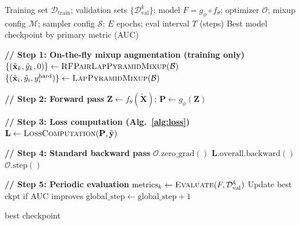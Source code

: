 \documentclass[12pt]{article}
\begin{document}
\clearpage
\begin{algorithm}[p]
\caption{Training Loop (per epoch)}
\label{alg:train}
\begin{algorithmic}[1]
\Require
  Training set $\mathcal{D}_{\text{train}}$; validation sets $\{\mathcal{D}_{\text{val}}^k\}$;
  model $F = g_\phi \circ f_\theta$; optimizer $\mathcal{O}$;
  mixup config $\mathcal{M}$; sampler config $\mathcal{S}$; $E$ epochs; eval interval $T$ (steps)
\Ensure
  Best model checkpoint by primary metric (AUC)


    \State \textbf{// Step 1: On-the-fly mixup augmentation (training only)}
        \State $\{(\tilde{\mathbf{x}}_k, \tilde{y}_k, 0)\} \gets \textsc{RFPairLapPyramidMixup}(\mathcal{B})$ 
      \Else
        \State $\{(\tilde{\mathbf{x}}_i, \tilde{y}_i, y^{\text{hard}}_i)\} \gets \textsc{LapPyramidMixup}(\mathcal{B})$ 
      \EndIf
    \EndIf

    \State \textbf{// Step 2: Forward pass}
    \State $\mathbf{Z} \gets f_\theta(\tilde{\mathbf{X}})$; \quad $\mathbf{P} \gets g_\phi(\mathbf{Z})$

    \State \textbf{// Step 3: Loss computation (Alg.~\ref{alg:loss})}
    \State $\mathbf{L} \gets \textsc{LossComputation}(\mathbf{P}, \tilde{\mathbf{y}})$

    \State \textbf{// Step 4: Standard backward pass}
    \State $\mathcal{O}.\text{zero\_grad}()$
    \State $\mathbf{L}.\text{overall}.\text{backward}()$
    \State $\mathcal{O}.\text{step}()$

    \State \textbf{// Step 5: Periodic evaluation}
        \State $\text{metrics}_k \gets \textsc{Evaluate}(F, \mathcal{D}_{\text{val}}^k)$ 
        \State Update best ckpt if AUC improves
      \EndFor
    \EndIf
    \State $\text{global\_step} \gets \text{global\_step} + 1$

  \EndFor
\EndFor
\State \Return best checkpoint
\end{algorithmic}
\end{algorithm}
\end{document}
